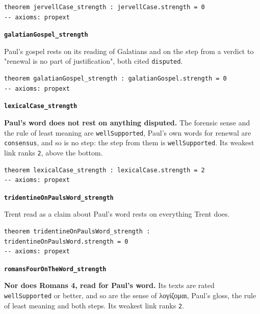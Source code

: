 \documentclass[11pt]{article}
\begin{document}
{\small\begin{verbatim}
theorem jervellCase_strength : jervellCase.strength = 0
-- axioms: propext
\end{verbatim}}
\par\medskip\noindent\textbf{\texttt{galatian\allowbreak{}Gospel\_\allowbreak{}strength}}\par\nobreak\noindent
Paul's gospel rests on its reading of Galatians and on the step from a verdict to "renewal is no part of justification", both cited \texttt{disputed}.

{\small\begin{verbatim}
theorem galatianGospel_strength : galatianGospel.strength = 0
-- axioms: propext
\end{verbatim}}
\par\medskip\noindent\textbf{\texttt{lexical\allowbreak{}Case\_\allowbreak{}strength}}\par\nobreak\noindent
\textbf{Paul's word does not rest on anything disputed.} The forensic sense and the rule of least meaning are \texttt{well\allowbreak{}Supported}, Paul's own words for renewal are \texttt{consensus}, and so is no step: the step from them is \texttt{well\allowbreak{}Supported}. Its weakest link ranks \texttt{2}, above the bottom.

{\small\begin{verbatim}
theorem lexicalCase_strength : lexicalCase.strength = 2
-- axioms: propext
\end{verbatim}}
\par\medskip\noindent\textbf{\texttt{tridentine\allowbreak{}On\allowbreak{}Pauls\allowbreak{}Word\_\allowbreak{}strength}}\par\nobreak\noindent
Trent read as a claim about Paul's word rests on everything Trent does.

{\small\begin{verbatim}
theorem tridentineOnPaulsWord_strength : tridentineOnPaulsWord.strength = 0
-- axioms: propext
\end{verbatim}}
\par\medskip\noindent\textbf{\texttt{romans\allowbreak{}Four\allowbreak{}On\allowbreak{}The\allowbreak{}Word\_\allowbreak{}strength}}\par\nobreak\noindent
\textbf{Nor does Romans 4, read for Paul's word.} Its texts are rated \texttt{well\allowbreak{}Supported} or better, and so are the sense of λογίζομαι, Paul's gloss, the rule of least meaning and both steps. Its weakest link ranks \texttt{2}.
\end{document}
